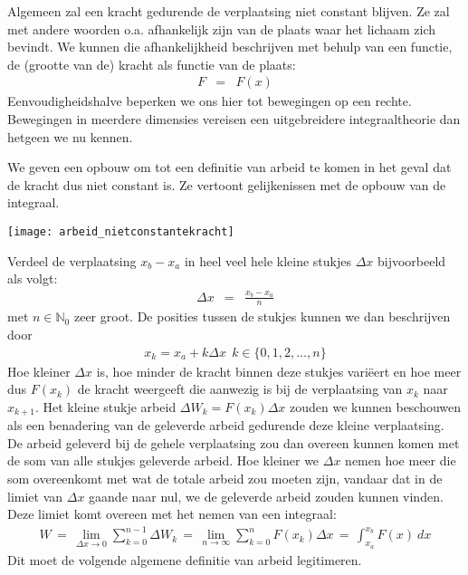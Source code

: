 \documentclass{ximera}
\begin{document}
	\author{Bart Lambregs}
    \xmsource\xmuitleg






	Algemeen zal een kracht gedurende de verplaatsing niet constant blijven. Ze zal met andere woorden o.a. afhankelijk zijn van de plaats waar het lichaam zich bevindt. We kunnen die afhankelijkheid beschrijven met behulp van een functie, de (grootte van de) kracht
	als functie van de plaats:
	\begin{eqnarray*}
	F&=&F(x)
	\end{eqnarray*}
	Eenvoudigheidshalve beperken we ons hier tot bewegingen op een rechte. Bewegingen in meerdere dimensies vereisen een uitgebreidere integraaltheorie dan hetgeen we nu kennen.
	
	We geven een opbouw om tot een definitie van arbeid te komen in het geval dat de kracht dus niet constant is. Ze vertoont gelijkenissen met de opbouw van de integraal.
	\begin{image}
	
	\texttt{[image: arbeid\_nietconstantekracht]}
	\end{image}
	
	Verdeel de verplaatsing $x_b-x_a$ in heel veel hele kleine stukjes $\Delta x$ bijvoorbeeld als volgt:
	\begin{eqnarray*}
	\Delta x&=&\frac{x_b-x_a}{n}
	\end{eqnarray*}
	met $n\in\mathbb{N}_0$ zeer groot. De posities tussen de stukjes kunnen we dan be\-schrij\-ven door
	\begin{eqnarray*}
	x_k=x_a+k\Delta x\ \ k\in\{0,1,2,\ldots,n\}
	\end{eqnarray*}
	Hoe kleiner $\Delta x$ is, hoe minder de kracht binnen deze stukjes variëert en hoe meer dus $F(x_k)$ de kracht weergeeft die aanwezig is bij de verplaatsing van $x_{k}$ naar $x_{k+1}$. Het kleine stukje arbeid $\Delta W_k=F(x_k)\Delta x$ zouden we kunnen beschouwen als
	een benadering van de geleverde arbeid gedurende deze kleine verplaatsing. De arbeid geleverd bij de gehele verplaatsing zou dan overeen kunnen komen met de som van alle stukjes geleverde arbeid. Hoe kleiner we $\Delta x$ nemen hoe meer die som overeenkomt met wat de totale arbeid zou moeten zijn, vandaar dat in de limiet van $\Delta x$ gaande naar nul, we de geleverde arbeid zouden kunnen vinden. Deze limiet komt overeen met het nemen van een integraal:
	\begin{eqnarray*}
	W\,=\,\lim_{\Delta x\rightarrow0}\sum_{k=0}^{n-1}\Delta W_k
	\,=\,\lim_{n\rightarrow\infty}\sum_{k=0}^{n}F(x_k)\Delta x
	\,=\,\int_{x_a}^{x_b}F(x)~dx
	\end{eqnarray*}
	Dit moet de volgende algemene definitie van arbeid legitimeren.
	
\end{document}
